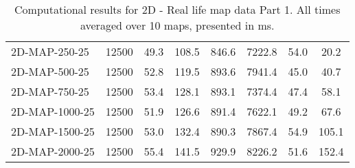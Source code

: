 \documentclass{article}
\begin{document}
\begin{table}[h]
\begin{center}
\begin{tabular}{|l||c|c|c|c|c|c|c|}
            2D-MAP-250-25                  & 12500 & 49.3      & 108.5      & 846.6       & 7222.8   & 54.0      & 20.2       \\
            2D-MAP-500-25                  & 12500 & 52.8      & 119.5      & 893.6       & 7941.4   & 45.0      & 40.7       \\
            2D-MAP-750-25                  & 12500 & 53.4      & 128.1      & 893.1       & 7374.4   & 47.4      & 58.1       \\
            2D-MAP-1000-25                 & 12500 & 51.9      & 126.6      & 891.4       & 7622.1   & 49.2      & 67.6       \\
            2D-MAP-1500-25                 & 12500 & 53.0      & 132.4      & 890.3       & 7867.4   & 54.9      & 105.1      \\
            2D-MAP-2000-25                 & 12500 & 55.4      & 141.5      & 929.9       & 8226.2   & 51.6      & 152.4      \\
            \hline
        \end{tabular}
        \caption{Computational results for 2D - Real life map data Part 1. All times averaged over 10 maps, presented in ms.}
    \end{center}
    \end{table}
\end{document}
